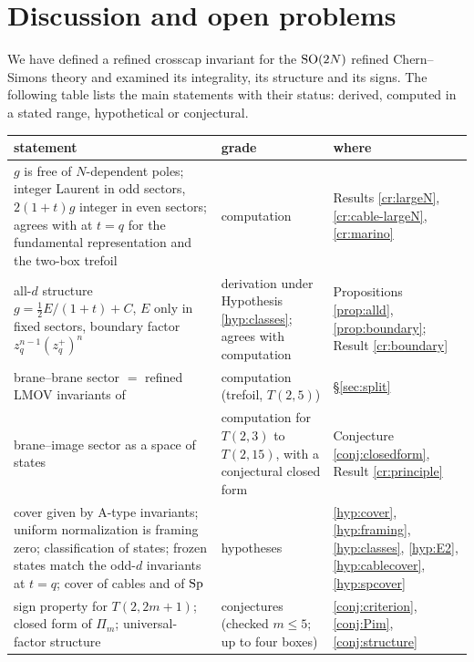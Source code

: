\section{Discussion and open problems}\label{sec:discussion}

We have defined a refined crosscap invariant for the $\mathrm{SO}(2N)$ refined Chern--Simons theory and examined its integrality, its structure and its signs. The following table lists the main statements with their status: derived, computed in a stated range, hypothetical or conjectural.
\begin{center}
\small
\setlength{\tabcolsep}{4pt}
\begin{tabular}{>{\raggedright\arraybackslash}p{7.6cm}>{\raggedright\arraybackslash}p{3.0cm}>{\raggedright\arraybackslash}p{3.8cm}}
\toprule
statement & grade & where \\
\midrule
\addlinespace
$g$ is free of $N$-dependent poles; integer Laurent in odd sectors, $2(1+t)g$ integer in even sectors; agrees with \cite{Marino09} at $t = q$ for the fundamental representation and the two-box trefoil & computation & Results \ref{cr:largeN}, \ref{cr:cable-largeN}, \ref{cr:marino} \\
\addlinespace
all-$d$ structure $g = \tfrac12 E/(1+t) + C$, $E$ only in fixed sectors, boundary factor $z_q^{n-1}(z_q^+)^n$ & derivation under Hypothesis \ref{hyp:classes}; agrees with computation & Propositions \ref{prop:alld}, \ref{prop:boundary}; Result \ref{cr:boundary} \\
\addlinespace
brane--brane sector $=$ refined LMOV invariants of \cite{KN17} & computation (trefoil, $T(2,5)$) & \S\ref{sec:split} \\
\addlinespace
brane--image sector as a space of states & computation for $T(2,3)$ to $T(2,15)$, with a conjectural closed form & Conjecture \ref{conj:closedform}, Result \ref{cr:principle} \\
\addlinespace
cover given by A-type invariants; uniform normalization is framing zero; classification of states; frozen states match the odd-$d$ invariants at $t = q$; cover of cables and of $\mathrm{Sp}$ & hypotheses & \ref{hyp:cover}, \ref{hyp:framing}, \ref{hyp:classes}, \ref{hyp:E2}, \ref{hyp:cablecover}, \ref{hyp:spcover} \\
\addlinespace
sign property for $T(2,2m+1)$; closed form of $\Pi_m$; universal-factor structure & conjectures (checked $m \le 5$; up to four boxes) & \ref{conj:criterion}, \ref{conj:Pim}, \ref{conj:structure} \\
\bottomrule
\end{tabular}
\end{center}

